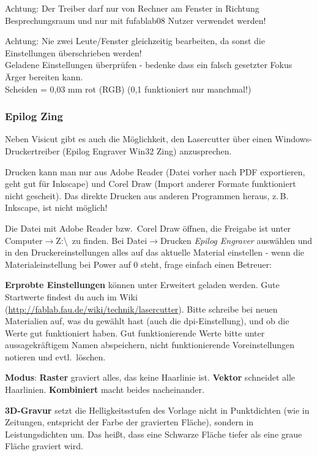 \documentclass{\basedir/fablab-document}
\renewcommand{\todo}[1]{\textbf{\color{red}{TODO: #1}}}
\begin{document}
	Achtung: Der Treiber darf nur von Rechner am Fenster in Richtung Besprechungsraum und nur mit fufablab08 Nutzer verwendet werden!

	Achtung: Nie zwei Leute/Fenster gleichzeitig bearbeiten, da sonst die Einstellungen überschrieben werden! \\
	Geladene Einstellungen überprüfen - bedenke dass ein falsch gesetzter Fokus Ärger bereiten kann. \\
	Scheiden = 0,03 mm rot (RGB) (0,1 funktioniert nur manchmal!)

	\todo{...}

	\subsubsection{Epilog Zing}

	Neben Visicut gibt es auch die Möglichkeit, den Lasercutter über einen Windows-Druckertreiber (Epilog Engraver Win32 Zing) anzusprechen.

	Drucken kann man nur aus Adobe Reader (Datei vorher nach PDF exportieren, geht gut für Inkscape) und Corel Draw (Import anderer Formate funktioniert nicht gescheit).  Das direkte Drucken aus anderen Programmen heraus, z.\,B. Inkscape, ist nicht möglich!

	Die Datei mit Adobe Reader bzw.\  Corel Draw öffnen, die Freigabe ist unter Computer$\rightarrow$Z:\textbackslash \ zu finden. Bei Datei$\rightarrow$Drucken \textit{Epilog Engraver} auswählen und in den Druckereinstellungen alles auf das aktuelle Material einstellen - wenn die Materialeinstellung bei Power auf 0 steht, frage einfach einen Betreuer:

	\textbf{Erprobte Einstellungen} können unter Erweitert geladen werden. Gute Startwerte findest du auch im Wiki (\url{http://fablab.fau.de/wiki/technik/lasercutter}). Bitte schreibe bei neuen Materialien auf, was du gewählt hast (auch die dpi-Einstellung), und ob die Werte gut funktioniert haben. Gut funktionierende Werte bitte unter aussagekräftigem Namen abspeichern, nicht funktionierende Voreinstellungen notieren und evtl.\  löschen.

	\textbf{Modus}: \textbf{Raster} graviert alles, das keine Haarlinie ist. \textbf{Vektor} schneidet alle Haarlinien. \textbf{Kombiniert} macht beides nacheinander.

	\textbf{3D-Gravur} setzt die Helligkeitsstufen des Vorlage nicht in Punktdichten (wie in Zeitungen, entspricht der Farbe der gravierten Fläche), sondern in Leistungsdichten um. Das heißt, dass eine Schwarze Fläche tiefer als eine graue Fläche graviert wird.
\end{document}
